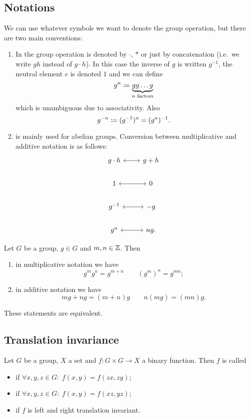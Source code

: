 \subsection{Notations}
We can use whatever symbols we want to denote the group operation, but there are two main conventions:
\begin{enumerate}
\item In  the group operation is denoted by $\boldsymbol{\cdot}$, $*$ or just by concatenation (i.e.\ we write $gh$ instead of $g\cdot h$). In this case the inverse of $g$ is written $g^{-1}$, the neutral element $e$ is denoted $1$ and we can define
\[ g^n \coloneqq \underbrace{gg\ldots g}_{\text{$n$ factors}}\]
which is unambiguous due to associativity. Also
\[ g^{-n} \coloneqq (g^{-1})^n = (g^{n})^{-1}. \]
\item {} is mainly used for abelian groups. Conversion between multiplicative and additive notation is as follows:
\[ \begin{tikzcd}
g\cdot h \arrow[r, leftrightarrow]& g+h \\
1 \arrow[r, leftrightarrow]& 0 \\
g^{-1} \arrow[r, leftrightarrow]& -g \\
g^n \arrow[r, leftrightarrow] & ng.
\end{tikzcd} \]
\end{enumerate}

\begin{lemma} \label{calculusRepeatedGroupOperation}
Let $G$ be a group, $g\in G$ and $m,n\in \mathbb{Z}$. Then
\begin{enumerate}
\item in multiplicative notation we have
\[ g^mg^n = g^{m+n} \qquad (g^m)^n = g^{mn}; \]
\item in additive notation we have
\[ mg+ng = (m+n)g \qquad n(mg) = (mn)g. \]
\end{enumerate}
These statements are equivalent.
\end{lemma}

\subsection{Translation invariance}
\label{sec:translationInvariance}
\begin{definition}
Let $G$ be a group, $X$ a set and $f:G\times G \to X$ a binary function. Then $f$ is called
\begin{itemize}
\item {} if $\forall x,y,z\in G:\; f(x, y) = f(zx,zy)$;
\item {} if $\forall x,y,z\in G:\; f(x, y) = f(xz,yz)$;
\item {} if $f$ is left and right translation invariant.
\end{itemize}
\end{definition}

